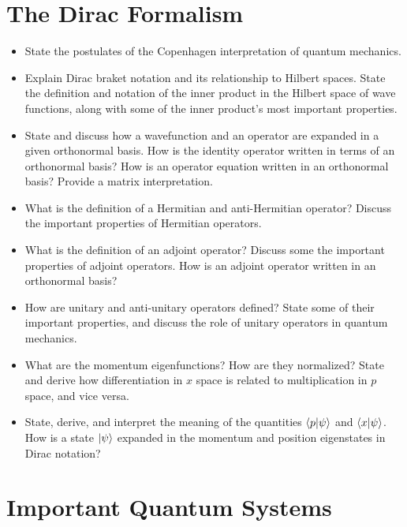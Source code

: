 \section{The Dirac Formalism}

\begin{itemize}

    \item State the postulates of the Copenhagen interpretation of quantum mechanics.

    \item Explain Dirac braket notation and its relationship to Hilbert spaces. State the definition and notation of the inner product in the Hilbert space of wave functions, along with some of the inner product's most important properties.

    \item State and discuss how a wavefunction and an operator are expanded in a given orthonormal basis. How is the identity operator written in terms of an orthonormal basis? How is an operator equation written in an orthonormal basis? Provide a matrix interpretation.

    \item What is the definition of a Hermitian and anti-Hermitian operator? Discuss the important properties of Hermitian operators.

    \item What is the definition of an adjoint operator? Discuss some the important properties of adjoint operators. How is an adjoint operator written in an orthonormal basis?

    \item How are unitary and anti-unitary operators defined? State some of their important properties, and discuss the role of unitary operators in quantum mechanics.

    \item What are the momentum eigenfunctions? How are they normalized? State and derive how differentiation in $ x $ space is related to multiplication in $ p $ space, and vice versa.

    \item State, derive, and interpret the meaning of the quantities $ \braket{p}{\psi} $ and $ \braket{x}{\psi} $.
    How is a state $ \ket{\psi} $ expanded in the momentum and position eigenstates in Dirac notation?

\end{itemize}

\section{Important Quantum Systems}

